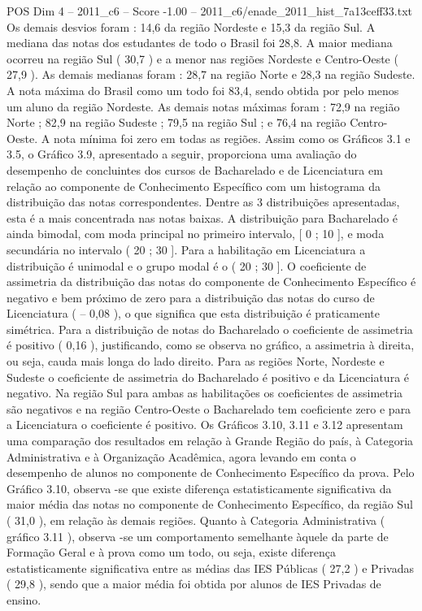 \begin{textsample}{POS Dim 4 – 2011\_c6 – Score -1.00 – 2011\_c6/enade\_2011\_hist\_7a13ceff33.txt}
Os demais desvios foram : 14,6 da região Nordeste e 15,3 da região Sul.
A mediana das notas dos estudantes de todo o Brasil foi 28,8.
A maior mediana ocorreu na região Sul ( 30,7 ) e a menor nas regiões Nordeste e Centro-Oeste ( 27,9 ).
As demais medianas foram : 28,7 na região Norte e 28,3 na região Sudeste.
A nota máxima do Brasil como um todo foi 83,4, sendo obtida por pelo menos um aluno da região Nordeste.
As demais notas máximas foram : 72,9 na região Norte ; 82,9 na região Sudeste ; 79,5 na região Sul ; e 76,4 na região Centro-Oeste.
A nota mínima foi zero em todas as regiões.
Assim como os Gráficos 3.1 e 3.5, o Gráfico 3.9, apresentado a seguir, proporciona uma avaliação do desempenho de concluintes dos cursos de Bacharelado e de Licenciatura em relação ao componente de Conhecimento Específico com um histograma da distribuição das notas correspondentes.
Dentre as 3 distribuições apresentadas, esta é a mais concentrada nas notas baixas.
A distribuição para Bacharelado é ainda bimodal, com moda principal no primeiro intervalo, [ 0 ; 10 ], e moda secundária no intervalo ( 20 ; 30 ].
Para a habilitação em Licenciatura a distribuição é unimodal e o grupo modal é o ( 20 ; 30 ].
O coeficiente de assimetria da distribuição das notas do componente de Conhecimento Específico é negativo e bem próximo de zero para a distribuição das notas do curso de Licenciatura ( – 0,08 ), o que significa que esta distribuição é praticamente simétrica.
Para a distribuição de notas do Bacharelado o coeficiente de assimetria é positivo ( 0,16 ), justificando, como se observa no gráfico, a assimetria à direita, ou seja, cauda mais longa do lado direito.
Para as regiões Norte, Nordeste e Sudeste o coeficiente de assimetria do Bacharelado é positivo e da Licenciatura é negativo.
Na região Sul para ambas as habilitações os coeficientes de assimetria são negativos e na região Centro-Oeste o Bacharelado tem coeficiente zero e para a Licenciatura o coeficiente é positivo.
Os Gráficos 3.10, 3.11 e 3.12 apresentam uma comparação dos resultados em relação à Grande Região do país, à Categoria Administrativa e à Organização Acadêmica, agora levando em conta o desempenho de alunos no componente de Conhecimento Específico da prova.
Pelo Gráfico 3.10, observa -se que existe diferença estatisticamente significativa da maior média das notas no componente de Conhecimento Específico, da região Sul ( 31,0 ), em relação às demais regiões.
Quanto à Categoria Administrativa ( gráfico 3.11 ), observa -se um comportamento semelhante àquele da parte de Formação Geral e à prova como um todo, ou seja, existe diferença estatisticamente significativa entre as médias das IES Públicas ( 27,2 ) e Privadas ( 29,8 ), sendo que a maior média foi obtida por alunos de IES Privadas de ensino.

\end{textsample}
